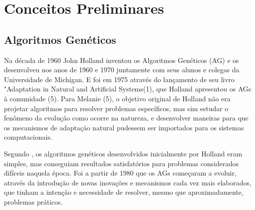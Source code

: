 ﻿\chapter{Conceitos Preliminares}
\label{cap:conceitos_preliminares}

\section{Algoritmos Genéticos}

Na década de 1960 John Holland inventou os Algoritmos Genéticos (AG) e os desenvolveu nos anos de 1960 e 1970 juntamente com seus alunos e colegas da Universidade de Michigan. E foi em 1975 através do lançamento de seu livro "Adaptation in Natural and Artificial Systems(1), que Holland apresentou os AGs à comunidade (5). Para Melanie (5), o objetivo original de Holland não era projetar algoritmos para resolver problemas específicos, mas sim estudar o fenômeno da evolução como ocorre na natureza, e desenvolver maneiras para que os mecanismos de adaptação natural pudessem ser importados para os sistemas computacionais.

Segundo \cite{linden12}, os algoritmos genéticos desenvolvidos inicialmente por Holland eram simples, mas conseguiam resultados satisfatórios para problemas considerados difíceis naquela época. Foi a partir de 1980 que os AGs começaram a evoluir, através da introdução de novas inovações e mecanismos cada vez mais elaborados, que tinham a intenção e necessidade de resolver, mesmo que aproximadamente, problemas práticos.

